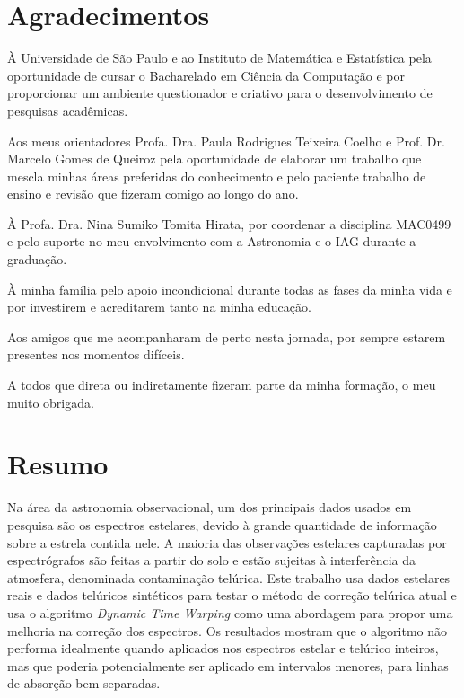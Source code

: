 \documentclass[12pt,twoside,a4paper]{book}
\begin{document}
\clearpage


\chapter*{Agradecimentos}
À Universidade de São Paulo e ao Instituto de Matemática e Estatística pela oportunidade de cursar o Bacharelado em Ciência da Computação e por proporcionar um ambiente questionador e criativo para o desenvolvimento de pesquisas acadêmicas.

Aos meus orientadores Profa. Dra. Paula Rodrigues Teixeira Coelho e Prof. Dr. Marcelo Gomes de Queiroz pela oportunidade de elaborar um trabalho que mescla minhas áreas preferidas do conhecimento e pelo paciente trabalho de ensino e revisão que fizeram comigo ao longo do ano.

À Profa. Dra. Nina Sumiko Tomita Hirata, por coordenar a disciplina MAC0499 e pelo suporte no meu envolvimento com a Astronomia e o IAG durante a graduação.

À minha família pelo apoio incondicional durante todas as fases da minha vida e por investirem e acreditarem tanto na minha educação.

Aos amigos que me acompanharam de perto nesta jornada, por sempre estarem presentes nos momentos difíceis. 

A todos que direta ou indiretamente fizeram parte da minha formação, o meu muito obrigada.

\chapter*{Resumo}

Na área da astronomia observacional, um dos principais dados usados em pesquisa são os espectros estelares, devido à grande quantidade de informação sobre a estrela contida nele. A maioria das observações estelares capturadas por espectrógrafos são feitas a partir do solo e estão sujeitas à interferência da atmosfera, denominada contaminação telúrica. Este trabalho usa dados estelares reais e dados telúricos sintéticos para testar o método de correção telúrica atual e usa o algoritmo \textit{Dynamic Time Warping} como uma abordagem para propor uma melhoria na correção dos espectros. Os resultados mostram que o algoritmo não performa idealmente quando aplicados nos espectros estelar e telúrico inteiros, mas que poderia potencialmente ser aplicado em intervalos menores, para linhas de absorção bem separadas.
\\
\end{document}
